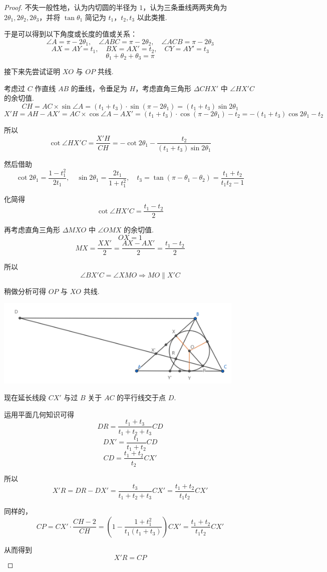 \begin{proof}
    不失一般性地，认为内切圆的半径为 $1$，认为三条垂线两两夹角为 $2\theta_1, 2\theta_2, 2\theta_3$，并将 $\tan \theta_1$ 简记为 $t_1$，$t_2, t_3$ 以此类推.

    于是可以得到以下角度或长度的值或关系：
    \[\angle A = \pi - 2\theta_1, \quad \angle ABC = \pi - 2\theta_2, \quad \angle ACB = \pi - 2\theta_3\]
    \[AX = AY = t_1, \quad BX = AX' = t_2, \quad CY = AY' = t_3\]
    \[\theta_1 + \theta_2 + \theta_3 = \pi\]

    接下来先尝试证明 $XO$ 与 $OP$ 共线.

    考虑过 $C$ 作直线 $AB$ 的垂线，令垂足为 $H$，考虑直角三角形 $\Delta CHX'$ 中 $\angle HX'C$ 的余切值.
    \[CH = AC \times \sin \angle A = (t_1 + t_3) \cdot \sin(\pi - 2\theta_1) = (t_1 + t_3) \sin 2\theta_1\]
    \[X'H = AH - AX' = AC \times \cos \angle A - AX' = (t_1 + t_3) \cdot \cos(\pi - 2\theta_1) - t_2 = -(t_1 + t_3) \cos 2\theta_1 - t_2\]

    所以
    \[\cot \angle HX'C = \frac{X'H}{CH} = -\cot 2\theta_1 - \frac{t_2}{(t_1 + t_3)\sin 2\theta_1}\]

    然后借助
    \[\cot 2\theta_1 = \frac{1 - t_1^2}{2t_1}, \quad \sin 2\theta_1 = \frac{2t_1}{1 + t_1^2}, \quad t_3 = \tan(\pi - \theta_1 - \theta_2) = \frac{t_1 + t_2}{t_1t_2 - 1}\]

    化简得
    \[\cot \angle HX'C = \frac{t_1 - t_2}{2}\]

    再考虑直角三角形 $\Delta MXO$ 中 $\angle OMX$ 的余切值.
    \[OX = 1\]
    \[MX = \frac{XX'}{2} = \frac{AX - AX'}{2} = \frac{t_1 - t_2}{2}\]

    所以
    \[\angle BX'C = \angle XMO \Rightarrow MO \parallel X'C\]

    稍做分析可得 $OP$ 与 $XO$ 共线.

    \includegraphics[width=0.9\textwidth]{pictures/6-30.2.png}

    现在延长线段 $CX'$ 与过 $B$ 关于 $AC$ 的平行线交于点 $D$.

    运用平面几何知识可得
    \[DR = \frac{t_1 + t_3}{t_1 + t_2 + t_3} CD\]
    \[DX' = \frac{t_1}{t_1 + t_2} CD\]
    \[CD = \frac{t_1 + t_2}{t_2} CX'\]

    所以
    \[X'R = DR - DX' = \frac{t_3}{t_1 + t_2 + t_3} CX' = \frac{t_1 + t_2}{t_1t_2} CX'\]

    同样的，
    \[CP = CX' \cdot \frac{CH - 2}{CH} = \left(1 - \frac{1 + t_1^2}{t_1(t_1 + t_3)}\right) CX' = \frac{t_1 + t_2}{t_1t_2} CX'\]

    从而得到
    \[X'R = CP\]
\end{proof}


